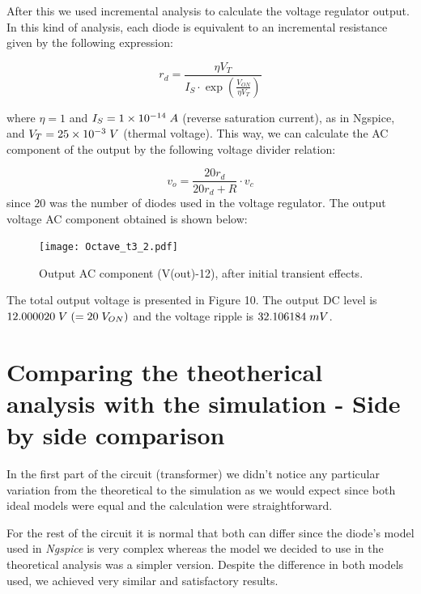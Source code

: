  
 After this we used incremental analysis to calculate the voltage regulator output.
  In this kind of analysis, each diode is equivalent to an incremental resistance given by the following expression:  
 
\begin{equation}
  r_{d} = \frac{\eta V_{T}}{I_{S}\cdot\exp{\left(\frac{V_{ON}}{\eta V_{T}}\right)}}
\end{equation}
  
 where $\eta=1$ and $I_{S}=1 \times 10^{-14} \hspace{1mm}A$ (reverse saturation current), as in Ngspice, and $V_{T}= 25 \times 10^{-3} \hspace{1mm}V$ 
 (thermal voltage). This way, we can calculate the AC component of the output by the following voltage divider relation:
 
 \begin{equation}
  v_{o}=\frac{20r_{d}}{20r_{d}+R}\cdot v_{c}
\end{equation}
 since $20$ was the number of diodes used in the voltage regulator.
 The output voltage AC component obtained is shown below:
 

  \begin{figure}[h] \centering
    \texttt{[image: Octave\_t3\_2.pdf]}
    \caption{Output AC component (V(out)-12), after initial transient effects.}
    \label{fig:1234}
  \end{figure} 
 
The total output voltage is presented in Figure 10.
The output DC level is $12.000020 \hspace{1mm}V\hspace{1mm} (= 20\hspace{1mm}V_{ON})$ and the voltage ripple is $32.106184\hspace{1mm}mV$.
 
 


\section{Comparing the theotherical analysis with the simulation - Side by side comparison}\label{sec:Comparison}
In the first part of the circuit (transformer) we didn't notice any particular variation from the theoretical to the simulation
as we would expect since both ideal models were equal and the calculation were straightforward.

For the rest of the circuit it is normal that both can differ since the diode's model used in \emph{Ngspice}
is very complex whereas the model we decided to use in the theoretical analysis was
a simpler version.
Despite the difference in both models used, we achieved very similar and satisfactory results.

